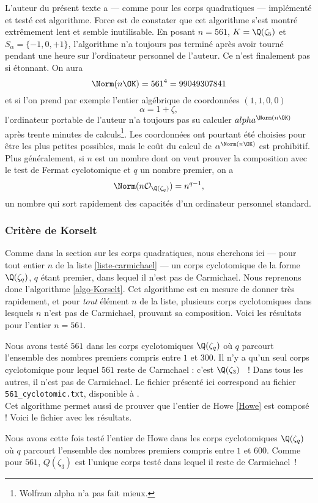 L'auteur du présent texte a — comme pour les corps quadratiques — implémenté et testé cet algorithme. Force est de constater que cet algorithme s'est montré extrêmement lent et semble inutilisable. En posant $n=561$, $K = \Q(\zeta_5)$ et $S_\alpha = \{-1, 0, +1\}$, l'algorithme n'a toujours pas terminé après avoir tourné pendant une heure sur l'ordinateur personnel de l'auteur. Ce n'est finalement pas si étonnant. On aura \[\Norm(n\OK) = 561^4 = 99049307841\] et si l'on prend par exemple l'entier algébrique de coordonnées $(1, 1, 0, 0)$ \[\alpha =1 + \zeta,\] l'ordinateur portable de l'auteur n'a toujours pas su calculer $alpha^{\Norm(n\OK)}$ après trente minutes de calculs\footnote{Wolfram alpha n'a pas fait mieux.}. Les coordonnées ont pourtant été choisies pour être les plus petites possibles, mais le coût du calcul de $\alpha^{\Norm(n\OK)}$ est prohibitif. Plus généralement, si $n$ est un nombre dont on veut prouver la composition avec le test de Fermat cyclotomique et $q$ un nombre premier, on a \[\Norm(n\mathcal{O}_{\Q(\zeta_q)}) = n^{q-1},\] un nombre qui sort rapidement des capacités d'un ordinateur personnel standard. 
\subsubsection{Critère de Korselt}

Comme dans la section sur les corps quadratiques, nous cherchons ici — pour tout entier $n$ de la liste \ref{liste-carmichael} — un corps cyclotomique de la forme $\Q(\zeta_q)$, $q$ étant premier, dans lequel il n'est pas de Carmichael. Nous reprenons donc l'algorithme \ref{algo-Korselt}. Cet algorithme est en mesure de donner très rapidement, et pour \emph{tout} élément $n$ de la liste, plusieurs corps cyclotomiques dans lesquels $n$ n'est pas de Carmichael, prouvant sa composition. Voici les résultats pour l'entier $n = 561$.

\vspace{1em}

Nous avons testé $561$ dans les corps cyclotomiques $\Q(\zeta_q)$ où $q$ parcourt l'ensemble des nombres premiers compris entre $1$ et $300$. Il n'y a qu'un seul corps cyclotomique pour lequel $561$ reste de Carmchael : c'est $\Q(\zeta_3)$ ~! Dans tous les autres, il n'est pas de Carmichael. Le fichier présenté ici correspond au fichier \texttt{561\_cyclotomic.txt}, disponible à . \\

Cet algorithme permet aussi de prouver que l'entier de Howe \ref{Howe} est composé ! Voici le fichier avec les résultats.

\vspace{1em}

Nous avons cette fois testé l'entier de Howe dans les corps cyclotomiques $\Q(\zeta_q)$ où $q$ parcourt l'ensemble des nombres premiers compris entre $1$ et $600$. Comme pour $561$, $Q(\zeta_3)$ est l'unique corps testé dans lequel il reste de Carmichael~!
